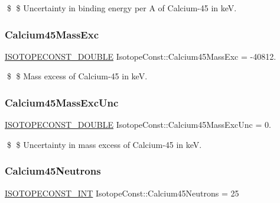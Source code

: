 \$ \$ Uncertainty in binding energy per A of Calcium-\/45 in keV. \mbox{\label{group___isotope_const-_calcium-_ca45_ga4da8f6b0dd6fea284b08f596199524da}} 
\subsubsection{\texorpdfstring{Calcium45\+Mass\+Exc}{Calcium45MassExc}}
{\footnotesize\ttfamily \mbox{\hyperlink{group___isotope_const-_macros_ga8f45a7272ce02c0b4c65c44636ed719a}{I\+S\+O\+T\+O\+P\+E\+C\+O\+N\+S\+T\+\_\+\+D\+O\+U\+B\+LE}} Isotope\+Const\+::\+Calcium45\+Mass\+Exc = -\/40812.}

\$ \$ Mass excess of Calcium-\/45 in keV. \mbox{\label{group___isotope_const-_calcium-_ca45_gaacc578e89e978be464fa0e92a4da25f4}} 
\subsubsection{\texorpdfstring{Calcium45\+Mass\+Exc\+Unc}{Calcium45MassExcUnc}}
{\footnotesize\ttfamily \mbox{\hyperlink{group___isotope_const-_macros_ga8f45a7272ce02c0b4c65c44636ed719a}{I\+S\+O\+T\+O\+P\+E\+C\+O\+N\+S\+T\+\_\+\+D\+O\+U\+B\+LE}} Isotope\+Const\+::\+Calcium45\+Mass\+Exc\+Unc = 0.}

\$ \$ Uncertainty in mass excess of Calcium-\/45 in keV. \mbox{\label{group___isotope_const-_calcium-_ca45_ga4b1cedc76484193c9d18f2ceb795d9b8}} 
\subsubsection{\texorpdfstring{Calcium45\+Neutrons}{Calcium45Neutrons}}
{\footnotesize\ttfamily \mbox{\hyperlink{group___isotope_const-_macros_ga5f18360b3e99483a35c32d789e62621c}{I\+S\+O\+T\+O\+P\+E\+C\+O\+N\+S\+T\+\_\+\+I\+NT}} Isotope\+Const\+::\+Calcium45\+Neutrons = 25}

